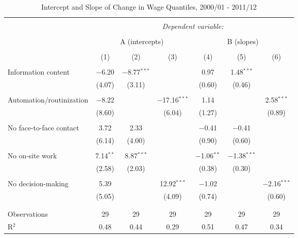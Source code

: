 

\begin{sidewaystable}[!htbp] \centering 
  \caption{Intercept and Slope of Change in Wage Quantiles, 2000/01 - 2011/12} 
  \label{} 
\begin{tabular}{@{\extracolsep{0pt}}lcccccc} 
\\[-1.8ex]\hline 
\hline \\[-1.8ex] 
 & \multicolumn{6}{c}{\textit{Dependent variable:}} \\ 
\cline{2-7} 
\\[-1.8ex] & \multicolumn{3}{c}{A (intercepts)} & \multicolumn{3}{c}{B (slopes)} \\ 
\\[-1.8ex] & (1) & (2) & (3) & (4) & (5) & (6)\\ 
\hline \\[-1.8ex] 
 Information content & $-$6.20 & $-$8.77$^{***}$ &  & 0.97 & 1.48$^{***}$ &  \\ 
  & (4.07) & (3.11) &  & (0.60) & (0.46) &  \\ 
  & & & & & & \\ 
 Automation/routinization & $-$8.22 &  & $-$17.16$^{***}$ & 1.14 &  & 2.58$^{***}$ \\ 
  & (8.60) &  & (6.04) & (1.27) &  & (0.89) \\ 
  & & & & & & \\ 
 No face-to-face contact & 3.72 & 2.33 &  & $-$0.41 & $-$0.41 &  \\ 
  & (6.14) & (4.00) &  & (0.90) & (0.60) &  \\ 
  & & & & & & \\ 
 No on-site work & 7.14$^{**}$ & 8.87$^{***}$ &  & $-$1.06$^{**}$ & $-$1.38$^{***}$ &  \\ 
  & (2.58) & (2.03) &  & (0.38) & (0.30) &  \\ 
  & & & & & & \\ 
 No decision-making & 5.39 &  & 12.92$^{***}$ & $-$1.02 &  & $-$2.16$^{***}$ \\ 
  & (5.05) &  & (4.09) & (0.74) &  & (0.60) \\ 
  & & & & & & \\ 
\hline \\[-1.8ex] 
Observations & 29 & 29 & 29 & 29 & 29 & 29 \\ 
R$^{2}$ & 0.48 & 0.44 & 0.29 & 0.51 & 0.47 & 0.34 \\ 

\end{tabular}
\end{sidewaystable}
